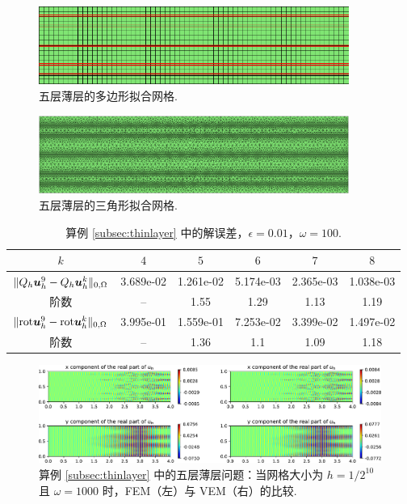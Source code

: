 \begin{figure}[H]
\centering
\includegraphics[width=4in]{./figures/maxwell/five_layer_interface.pdf}
\caption{五层薄层的多边形拟合网格.}
\label{fig:twolayerstrimesh}
\end{figure}


\begin{figure}[H]
\centering
\includegraphics[width=4in]{./figures/maxwell/mesh_five_layers.png}
\caption{五层薄层的三角形拟合网格.}
\label{fig:fivelayerspolymesh}
\end{figure}


\begin{table}[H]
\centering
\caption{算例 \ref{subsec:thinlayer} 中的解误差，$\epsilon =
0.01$，$\omega=100$.}
\label{tab:exm4}
\begin{tabular}[c]{|c|c|c|c|c|c|}\hline
$k$ & $4$ & $5$ & $6$ & $7$ & $8$
\\\hline
$\|Q_h\boldsymbol{u}_h^9 - Q_h \boldsymbol{u}_h^k\|_{0,\Omega}$ & 3.689e-02 & 1.261e-02 & 5.174e-03 & 2.365e-03 & 1.038e-03
\\\hline
阶数 & -- & 1.55 & 1.29 & 1.13 & 1.19
\\\hline
$\|\mathrm{rot} \boldsymbol{u}_h^9 - \mathrm{rot} \boldsymbol{u}_h^k\|_{0,\Omega}$ & 3.995e-01 & 1.559e-01 & 7.253e-02 & 3.399e-02 & 1.497e-02
\\\hline
阶数 & -- & 1.36 & 1.1  & 1.09 & 1.18
\\\hline
\end{tabular}
\end{table}


\begin{figure}[H]
\centering
\includegraphics[width=5.0in]{./figures/maxwell/five_layer.pdf}
\caption{算例 \ref{subsec:thinlayer} 中的五层薄层问题：当网格大小为 $h =
1/2^{10}$ 且 $\omega = 1000$ 时，FEM（左）与 VEM（右）的比较.}
\label{fig:femvsvemfivelayer}
\end{figure}


